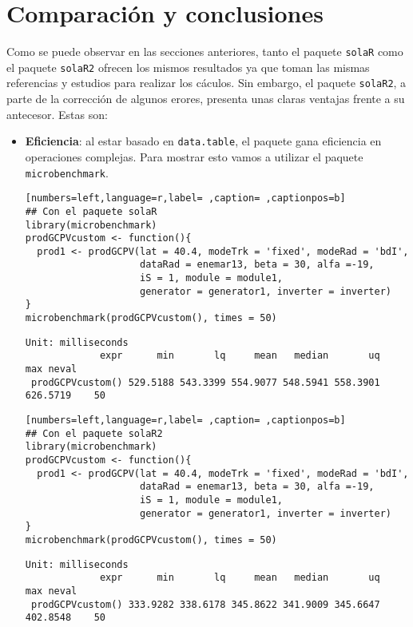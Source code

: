 \section{Comparación y conclusiones}
\label{sec:org2bbb619}
\label{sec:comparacion-conclusiones}
Como se puede observar en las secciones anteriores, tanto el paquete \texttt{solaR} como el paquete \texttt{solaR2} ofrecen los mismos resultados ya que toman las mismas referencias y estudios para realizar los cáculos. Sin embargo, el paquete \texttt{solaR2}, a parte de la corrección de algunos erores, presenta unas claras ventajas frente a su antecesor. Estas son:
\begin{itemize}
\item \textbf{Eficiencia}: al estar basado en \texttt{data.table}, el paquete gana eficiencia en operaciones complejas. Para mostrar esto vamos a utilizar el paquete \texttt{microbenchmark}.
\begin{lstlisting}[numbers=left,language=r,label= ,caption= ,captionpos=b]
## Con el paquete solaR
library(microbenchmark)
prodGCPVcustom <- function(){  
  prod1 <- prodGCPV(lat = 40.4, modeTrk = 'fixed', modeRad = 'bdI',
                    dataRad = enemar13, beta = 30, alfa =-19,
                    iS = 1, module = module1,
                    generator = generator1, inverter = inverter)
}
microbenchmark(prodGCPVcustom(), times = 50)
\end{lstlisting}

\begin{verbatim}
Unit: milliseconds
             expr      min       lq     mean   median       uq      max neval
 prodGCPVcustom() 529.5188 543.3399 554.9077 548.5941 558.3901 626.5719    50
\end{verbatim}


\begin{lstlisting}[numbers=left,language=r,label= ,caption= ,captionpos=b]
## Con el paquete solaR2
library(microbenchmark)
prodGCPVcustom <- function(){  
  prod1 <- prodGCPV(lat = 40.4, modeTrk = 'fixed', modeRad = 'bdI',
                    dataRad = enemar13, beta = 30, alfa =-19,
                    iS = 1, module = module1,
                    generator = generator1, inverter = inverter)
}
microbenchmark(prodGCPVcustom(), times = 50)
\end{lstlisting}

\begin{verbatim}
Unit: milliseconds
             expr      min       lq     mean   median       uq      max neval
 prodGCPVcustom() 333.9282 338.6178 345.8622 341.9009 345.6647 402.8548    50
\end{verbatim}



\end{itemize}
